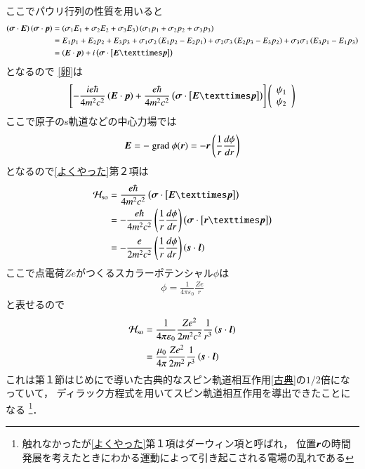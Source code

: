 \documentclass[a4paper,11pt]{jsarticle}
\numberwithin{equation}{section}
\newcommand{\bvec}[1]{\mbox{\boldmath $#1$}}
\begin{document}
ここでパウリ行列の性質を用いると
\begin{align}
  \left(\bvec{\sigma}\cdot\bvec{E}\right)\left(\bvec{\sigma}\cdot\bvec{p}\right)
  &=\left(\sigma_1E_1+\sigma_2E_2+\sigma_3E_3\right)
  \left(\sigma_1p_1+\sigma_2p_2+\sigma_3p_3\right) \nonumber\\
  &=E_1p_1+E_2p_2+E_3p_3+\sigma_1\sigma_2\left(E_1p_2-E_2p_1\right)+
  \sigma_2\sigma_3\left(E_2p_3-E_3p_2\right)+\sigma_3\sigma_1\left(E_3p_1-E_1p_3\right) \nonumber\\
  &=\left(\bvec{E}\cdot\bvec{p}\right)+i\left(\bvec{\sigma}\cdot\left[\bvec{E}×\bvec{p}\right]\right)
\end{align}となるので
\eqref{卵}は
\begin{equation}
    \begin{aligned}
      \left[
        -\frac{ie\hbar}{4m^2c^2}\left(\bvec{E}\cdot\bvec{p}\right)
        +\frac{e\hbar}{4m^2c^2}\left(\bvec{\sigma}\cdot\left[\bvec{E}×\bvec{p}\right]\right)
      \right]
      \left(
        \begin{array}{c}
        \psi_1 \\
        \psi_2
      \end{array}
      \right)
  \end{aligned}
  \label{よくやった}
\end{equation}
ここで原子のs軌道などの中心力場では
\begin{align}
  \bvec{E} = -\ \text{grad}\ \phi(\bvec{r}) =-\bvec{r}\left(\frac{1}{r}\frac{d\phi}{dr}\right)
\end{align}
となるので\eqref{よくやった}第２項は
\begin{align}
  \mathcal{H}_{\text{so}} &= \frac{e\hbar}{4m^2c^2}\left(\bvec{\sigma}\cdot\left[\bvec{E}×\bvec{p}\right]\right) \nonumber\\
&=-\frac{e\hbar}{4m^2c^2}\left(\frac{1}{r}\frac{d\phi}{dr}\right)
\left(\bvec{\sigma}\cdot\left[\bvec{r}×\bvec{p}\right]\right) \nonumber\\
&=-\frac{e}{2m^2c^2}\left(\frac{1}{r}\frac{d\phi}{dr}\right)\left(\bvec{s}\cdot\bvec{l}\right)
\end{align}
ここで点電荷$Ze$がつくるスカラーポテンシャル$\phi$は
\begin{align}
  \phi = \frac{1}{4\pi \varepsilon_0}\frac{Ze}{r}
\end{align}
と表せるので
\begin{align}
  \mathcal{H}_{\text{so}} &= \frac{1}{4\pi\varepsilon_0}\frac{Ze^2}{2m^2c^2}\frac{1}{r^3}\left(\bvec{s}\cdot\bvec{l}\right) \nonumber\\
  &= \frac{\mu_0}{4\pi}\frac{Ze^2}{2m^2}\frac{1}{r^3}\left(\bvec{s}\cdot\bvec{l}\right)
\end{align}
これは第１節はじめにで導いた古典的なスピン軌道相互作用\eqref{古典}の$1/2$倍になっていて，
ディラック方程式を用いてスピン軌道相互作用を導出できたことになる
\footnote{触れなかったが\eqref{よくやった}第１項はダーウィン項と呼ばれ，
位置$\bvec{r}$の時間発展を考えたときにわかる運動によって引き起こされる電場の乱れである}．
\end{document}
